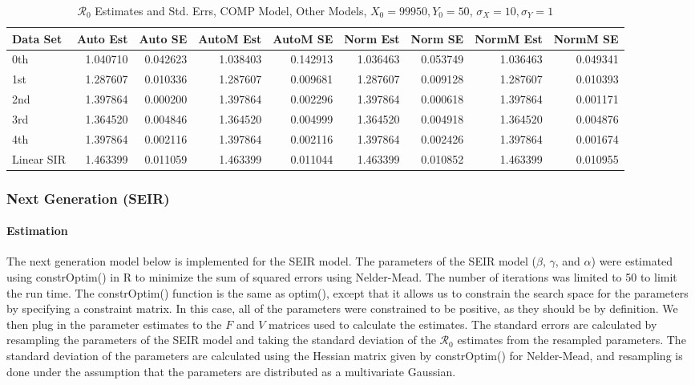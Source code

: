 \documentclass[12pt]{article}
\newcommand{\rr}{\ensuremath{\mathcal{R}_0}}
\begin{document}
\begin{table}[H]
	
	\caption{$\rr$ Estimates and Std. Errs, COMP Model,
		Other Models, $X_0 = 99950, Y_0 = 50$, 
		$\sigma_X = 10, \sigma_Y = 1$}
	\begin{footnotesize}
		\hskip -1cm
		\begin{tabular}{l|r|r|r|r|r|r|r|r}
			\hline
			Data Set & Auto Est & Auto SE & AutoM Est & AutoM SE & Norm Est & Norm SE & NormM Est & NormM SE\\
			\hline
			0th & 1.040710 & 0.042623 & 1.038403 & 0.142913 & 1.036463 & 0.053749 & 1.036463 & 0.049341\\
			\hline
			1st & 1.287607 & 0.010336 & 1.287607 & 0.009681 & 1.287607 & 0.009128 & 1.287607 & 0.010393\\
			\hline
			2nd & 1.397864 & 0.000200 & 1.397864 & 0.002296 & 1.397864 & 0.000618 & 1.397864 & 0.001171\\
			\hline
			3rd & 1.364520 & 0.004846 & 1.364520 & 0.004999 & 1.364520 & 0.004918 & 1.364520 & 0.004876\\
			\hline
			4th & 1.397864 & 0.002116 & 1.397864 & 0.002116 & 1.397864 & 0.002426 & 1.397864 & 0.001674\\
			\hline
			Linear SIR & 1.463399 & 0.011059 & 1.463399 & 0.011044 & 1.463399 & 0.010852 & 1.463399 & 0.010955\\
			\hline
		\end{tabular}
	\end{footnotesize}
\end{table}

\subsubsection{Next Generation (SEIR)}

\paragraph{Estimation}

The next generation model below is implemented for the SEIR model. The parameters of the SEIR model ($\beta$, $\gamma$, and $\alpha$) were estimated using constrOptim() in R to minimize the sum of squared errors using Nelder-Mead. The number of iterations was limited to 50 to limit the run time. The constrOptim() function is the same as optim(), except that it allows us to constrain the search space for the parameters by specifying a constraint matrix. In this case, all of the parameters were constrained to be positive, as they should be by definition. We then plug in the parameter estimates to the $F$ and $V$ matrices used to calculate the estimates. The standard errors are calculated by resampling the parameters of the SEIR model and taking the standard deviation of the $\rr$ estimates from the resampled parameters. The standard deviation of the parameters are calculated using the Hessian matrix given by constrOptim() for Nelder-Mead, and resampling is done under the assumption that the parameters are distributed as a multivariate Gaussian.
\end{document}
